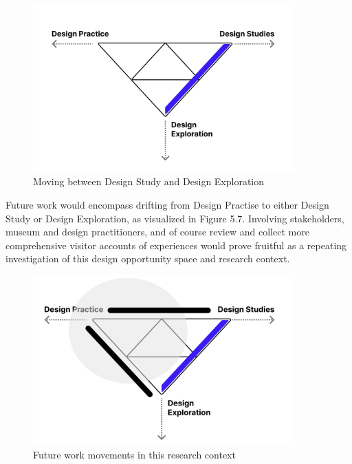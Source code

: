  \begin{figure}[H]
\centering
\includegraphics[width=10cm]{pictures/methodology/fallman_applied.png}
\caption{Moving between Design Study and Design Exploration}
\end{figure}

Future work would encompass drifting from Design Practise to either Design Study or Design Exploration, as visualized in Figure 5.7. Involving stakeholders, museum and design practitioners, and of course review and collect more comprehensive visitor accounts of experiences would prove fruitful as a repeating investigation of this design opportunity space and research context.

\begin{figure}[H]
\centering
\includegraphics[width=10cm]{pictures/methodology/fallman_future.png}
\caption{Future work movements in this research context}
\end{figure}
    